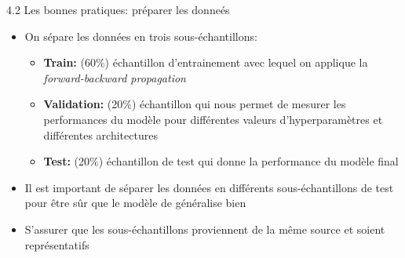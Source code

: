 \begin{frame}{4.2 Les bonnes pratiques: préparer les donneés}
  \begin{itemize}
  \item On sépare les données en trois sous-échantillons:
    \begin{itemize}
      \normalsize
    \item \textbf{Train:} (60$\%$) échantillon d'entrainement avec lequel on applique la \textit{forward-backward propagation}
    \item \textbf{Validation:} (20$\%$) échantillon qui nous permet de mesurer les performances du modèle pour différentes valeurs d'hyperparamètres et différentes architectures
    \item \textbf{Test:} (20$\%$) échantillon de test qui donne la performance du modèle final
    \end{itemize}
  \item Il est important de séparer les données en différents sous-échantillons de test pour être sûr que le modèle de généralise bien
  \item S'assurer que les sous-échantillons proviennent de la même source et soient représentatifs
  \end{itemize}
\end{frame}

